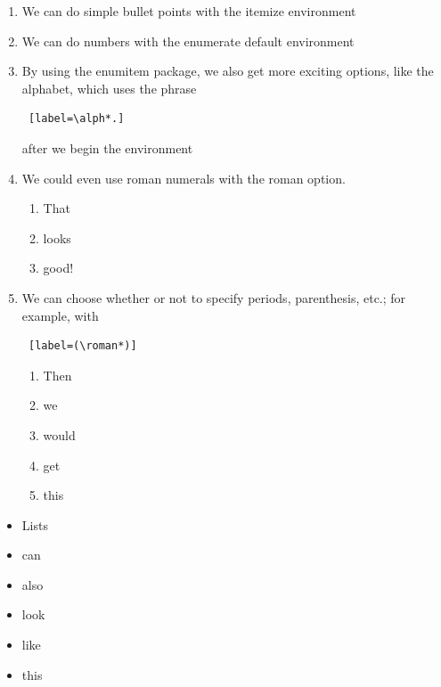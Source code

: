 \documentclass{article}
\begin{document}
\begin{enumerate}[label=\Alph*.]
	\item We can do simple bullet points with the itemize environment
	\item We can do numbers with the enumerate default environment
	\item By using the enumitem package, we also get more exciting options, like the alphabet, which uses the phrase \begin{verbatim} [label=\alph*.] \end{verbatim} after we begin the environment
	


	\item We could even use roman numerals with the roman option. 
	\begin{enumerate}[label=\Roman*]
		\item That
		\item looks
		\item good!
	\end{enumerate}
	\item We can choose whether or not to specify periods, parenthesis, etc.; for example, with \begin{verbatim} [label=(\roman*)] \end{verbatim}
	\begin{enumerate}[label=(\roman*)]
		\item Then
		\item we
		\item would
		\item get
		\item this
	\end{enumerate}
\end{enumerate}
	
\begin{itemize}
	\item Lists
	\item can
	\item also
	\item look
	\item like
	\item this
\end{itemize}

\end{document}
